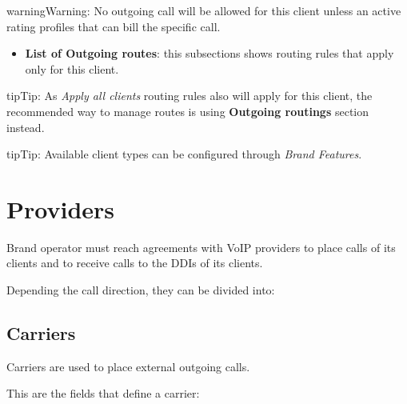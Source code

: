 \documentclass[letterpaper,10pt,english]{sphinxmanual}
\begin{document}
\begin{notice}{warning}{Warning:}
No outgoing call will be allowed for this client unless an active rating profiles that can
bill the specific call.
\end{notice}
\begin{itemize}
\item {} 
\textbf{List of Outgoing routes}: this subsections shows routing rules that apply only for this client.

\end{itemize}

\begin{notice}{tip}{Tip:}
As \emph{Apply all clients} routing rules also will apply for this client, the recommended way to manage routes is
using \textbf{Outgoing routings} section instead.
\end{notice}

\begin{notice}{tip}{Tip:}
Available client types can be configured through \emph{Brand Features}.
\end{notice}


\section{Providers}
\label{administration_portal/brand/providers/index::doc}\label{administration_portal/brand/providers/index:providers}
Brand operator must reach agreements with VoIP providers to place calls of its clients and to receive calls to the
DDIs of its clients.

Depending the call direction, they can be divided into:


\subsection{Carriers}
\label{administration_portal/brand/providers/carriers:id1}\label{administration_portal/brand/providers/carriers::doc}\label{administration_portal/brand/providers/carriers:carriers}
Carriers are used to place external outgoing calls.

This are the fields that define a carrier:
\end{document}
